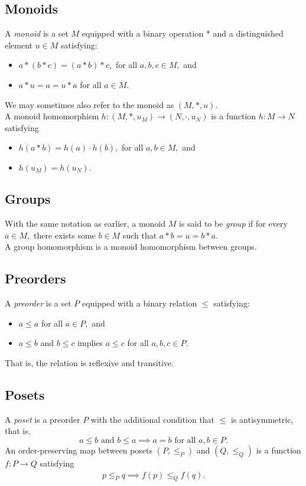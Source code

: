 \subsection{Monoids}
A \emph{monoid} is a set $M$ equipped with a binary operation $*$ and a distinguished element $u \in M$ satisfying:
\begin{itemize}
	\item $a*(b*c) = (a*b)*c,$ for all $a, b, c \in M,$ and
	\item $a*u = a = u*a$ for all $a \in M.$
\end{itemize}
We may sometimes also refer to the monoid as $(M, *, u).$\\
A monoid homomorphism $h:(M, *, u_M) \to (N, \cdot, u_N)$ is a function $h:M\to N$ satisfying
\begin{itemize}
	\item $h(a*b) = h(a)\cdot h(b),$ for all $a, b \in M,$ and
	\item $h(u_M) = h(u_N).$
\end{itemize}
\subsection{Groups}
With the same notation as earlier, a monoid $M$ is said to be \emph{group} if for every $a \in M,$ there exists some $b \in M$ such that $a * b = u = b * a.$\\
A group homomorphism is a monoid homomorphism between groups.
\subsection{Preorders}
A \emph{preorder} is a set $P$ equipped with a binary relation $\le$ satisfying:
\begin{itemize}
	\item $a \le a$ for all $a \in P,$ and
	\item $a \le b$ and $b \le c$ implies $a \le c$ for all $a, b, c \in P.$
\end{itemize}
That is, the relation is reflexive and transitive.
\subsection{Posets}
A \emph{poset} is a preorder $P$ with the additional condition that $\le$ is antisymmetric, that is,
	\begin{equation*} 
		a \le b \text{ and } b \le a \implies a = b \text{ for all } a, b \in P.
	\end{equation*}
An order-preserving map between posets $(P, \le_P)$ and $(Q, \le_Q)$ is a function $f:P\to Q$ satisfying
\begin{align*} 
	p \le_P q \implies f(p) \le_Q f(q). 
\end{align*}
